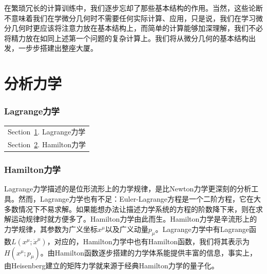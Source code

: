 \documentclass[10pt]{article}
\begin{document}
	在繁琐冗长的计算训练中，我们逐步忘却了那些基本结构的作用。当然，这些论断不意味着我们在学微分几何时不需要任何实际计算、应用，只是说，我们在学习微分几何时更应该将注意力放在基本结构上，而简单的计算能够加深理解，我们不必将精力放在如同上述第一个问题的复杂计算上。我们将从微分几何的基本结构出发，一步步搭建出整座大厦。

	\newpage

	\part{分析力学}\label{Part:Analytical}
\section{Lagrange力学}\label{sec:Lagrange}
	\begin{margintable}\vspace{1.4in}\footnotesize
		\begin{tabularx}{\marginparwidth}{|X}
		Section~\ref{sec:Lagrange}. Lagrange力学\\
		Section~\ref{sec:Hamilton}. Hamilton力学\\
		
		\end{tabularx}
	\end{margintable}

	\newpage
\section{Hamilton力学}\label{sec:Hamilton}
	Lagrange力学描述的是位形流形上的力学规律，是比Newton力学更深刻的分析工具。然而，Lagrange力学也有不足：Euler-Lagrange方程是一个二阶方程，它在大多数情况下不易求解。如果能想办法让描述力学系统的方程的阶数降下来，则在求解运动规律时就方便多了。Hamilton力学由此而生。Hamilton力学是辛流形上的力学规律，其参数为广义坐标$x^\mu$以及广义动量$p_\mu$。Lagrange力学中有Lagrange函数$L(x^\mu;{\dot{x}}^\mu)$，对应的，Hamilton力学中也有Hamilton函数，我们将其表示为$H(x^\mu;p_\mu)$。由Hamilton函数逐步搭建的力学体系能提供丰富的信息，事实上，由Heisenberg建立的矩阵力学就来源于经典Hamilton力学的量子化。
\end{document}
